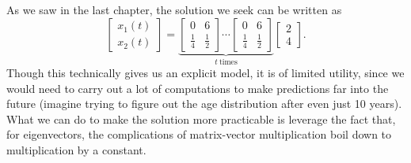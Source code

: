 \documentclass[../book.tex]{subfiles}
\begin{document}
As we saw in the last chapter, the solution we seek can be written as
\begin{equation}\label{eq:eig-35}
\begin{bmatrix}
  x_1 (t) \\ x_2(t)
\end{bmatrix}
=
\underbrace{
  \begin{bmatrix}
    0 & 6 \\ \frac{1}{4} & \frac{1}{2}
  \end{bmatrix}
  \cdots
  \begin{bmatrix}
    0 & 6 \\ \frac{1}{4} & \frac{1}{2}
  \end{bmatrix}
}_{t\ \text{times}}
\begin{bmatrix}
  2\\4
\end{bmatrix}.
\end{equation}
Though this technically gives us an explicit model, it is of limited utility, since we would need to carry out a lot of computations to make predictions far into the future (imagine trying to figure out the age distribution after even just 10 years). What we can do to make the solution more practicable is leverage the fact that, for eigenvectors, the complications of matrix-vector multiplication boil down to multiplication by a constant.
\end{document}

